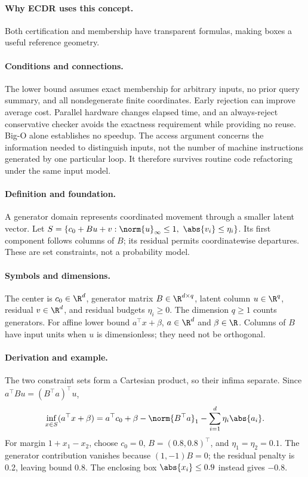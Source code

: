 \paragraph{Why ECDR uses this concept.}
Both certification and membership have transparent formulas, making boxes a useful reference geometry.
\paragraph{Conditions and connections.}
The lower bound assumes exact membership for arbitrary inputs, no prior query summary, and all nondegenerate finite coordinates. Early rejection can improve average cost. Parallel hardware changes elapsed time, and an always-reject conservative checker avoids the exactness requirement while providing no reuse. Big-O alone establishes no speedup. The access argument concerns the information needed to distinguish inputs, not the number of machine instructions generated by one particular loop. It therefore survives routine code refactoring under the same input model.

\paragraph{Definition and foundation.}
A generator domain represents coordinated movement through a smaller latent vector. Let $S=\{c_0+Bu+v:\norm{u}_\infty\le1,\ \abs{v_i}\le\eta_i\}$. Its first component follows columns of $B$; its residual permits coordinatewise departures. These are set constraints, not a probability model.
\paragraph{Symbols and dimensions.}
The center is $c_0\in\R^d$, generator matrix $B\in\R^{d\times q}$, latent column $u\in\R^q$, residual $v\in\R^d$, and residual budgets $\eta_i\ge0$. The dimension $q\ge1$ counts generators. For affine lower bound $a^\top x+\beta$, $a\in\R^d$ and $\beta\in\R$. Columns of $B$ have input units when $u$ is dimensionless; they need not be orthogonal.
\paragraph{Derivation and example.}
The two constraint sets form a Cartesian product, so their infima separate. Since $a^\top Bu=(B^\top a)^\top u$,
\[
 \inf_{x\in S}(a^\top x+\beta)
 =a^\top c_0+\beta-\norm{B^\top a}_1
   -\sum_{i=1}^d\eta_i\abs{a_i}.
\]
For margin $1+x_1-x_2$, choose $c_0=0$, $B=(0.8,0.8)^\top$, and $\eta_1=\eta_2=0.1$. The generator contribution vanishes because $(1,-1)B=0$; the residual penalty is 0.2, leaving bound 0.8. The enclosing box $\abs{x_i}\le0.9$ instead gives $-0.8$.
